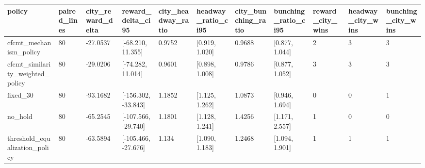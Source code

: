 \begin{tabular}{lllllllllll}
\toprule
policy & paired\_lines & city\_reward\_delta & reward\_delta\_ci95 & city\_headway\_ratio & headway\_ratio\_ci95 & city\_bunching\_ratio & bunching\_ratio\_ci95 & reward\_city\_wins & headway\_city\_wins & bunching\_city\_wins \\
\midrule
cfcmt\_mechanism\_policy & 80 & -27.0537 & [-68.210, 11.355] & 0.9752 & [0.919, 1.020] & 0.9688 & [0.877, 1.044] & 2 & 3 & 3 \\
cfcmt\_similarity\_weighted\_policy & 80 & -29.0206 & [-74.282, 11.014] & 0.9601 & [0.898, 1.008] & 0.9786 & [0.877, 1.052] & 3 & 3 & 3 \\
fixed\_30 & 80 & -93.1682 & [-156.302, -33.843] & 1.1852 & [1.125, 1.262] & 1.0873 & [0.946, 1.694] & 0 & 0 & 1 \\
no\_hold & 80 & -65.2545 & [-107.566, -29.740] & 1.1801 & [1.128, 1.241] & 1.4256 & [1.171, 2.557] & 1 & 0 & 0 \\
threshold\_equalization\_policy & 80 & -63.5894 & [-105.466, -27.676] & 1.134 & [1.090, 1.183] & 1.2468 & [1.094, 1.901] & 1 & 1 & 1 \\
\bottomrule
\end{tabular}
